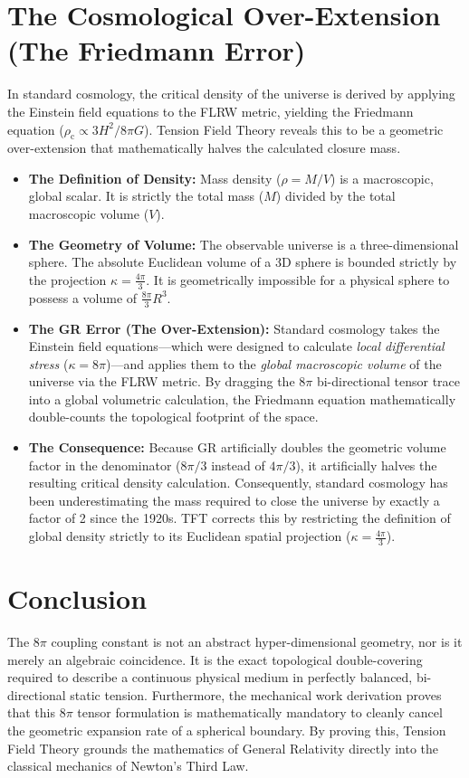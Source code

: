 \section{The Cosmological Over-Extension (The Friedmann Error)}
In standard cosmology, the critical density of the universe is derived by applying the Einstein field equations to the FLRW metric, yielding the Friedmann equation ($\rho_{\mathrm{c}} \propto 3H^2 / 8\pi G$). Tension Field Theory reveals this to be a geometric over-extension that mathematically halves the calculated closure mass.

\begin{itemize}
    \item \textbf{The Definition of Density:} Mass density ($\rho = M/V$) is a macroscopic, global scalar. It is strictly the total mass ($M$) divided by the total macroscopic volume ($V$). 
    \item \textbf{The Geometry of Volume:} The observable universe is a three-dimensional sphere. The absolute Euclidean volume of a 3D sphere is bounded strictly by the projection $\kappa = \frac{4\pi}{3}$. It is geometrically impossible for a physical sphere to possess a volume of $\frac{8\pi}{3} R^3$.
    \item \textbf{The GR Error (The Over-Extension):} Standard cosmology takes the Einstein field equations—which were designed to calculate \textit{local differential stress} ($\kappa = 8\pi$)—and applies them to the \textit{global macroscopic volume} of the universe via the FLRW metric. By dragging the $8\pi$ bi-directional tensor trace into a global volumetric calculation, the Friedmann equation mathematically double-counts the topological footprint of the space.
    \item \textbf{The Consequence:} Because GR artificially doubles the geometric volume factor in the denominator ($8\pi/3$ instead of $4\pi/3$), it artificially halves the resulting critical density calculation. Consequently, standard cosmology has been underestimating the mass required to close the universe by exactly a factor of 2 since the 1920s. TFT corrects this by restricting the definition of global density strictly to its Euclidean spatial projection ($\kappa = \frac{4\pi}{3}$).
\end{itemize}

\section{Conclusion}
The $8\pi$ coupling constant is not an abstract hyper-dimensional geometry, nor is it merely an algebraic coincidence. It is the exact topological double-covering required to describe a continuous physical medium in perfectly balanced, bi-directional static tension. Furthermore, the mechanical work derivation proves that this $8\pi$ tensor formulation is mathematically mandatory to cleanly cancel the geometric expansion rate of a spherical boundary. By proving this, Tension Field Theory grounds the mathematics of General Relativity directly into the classical mechanics of Newton's Third Law.

